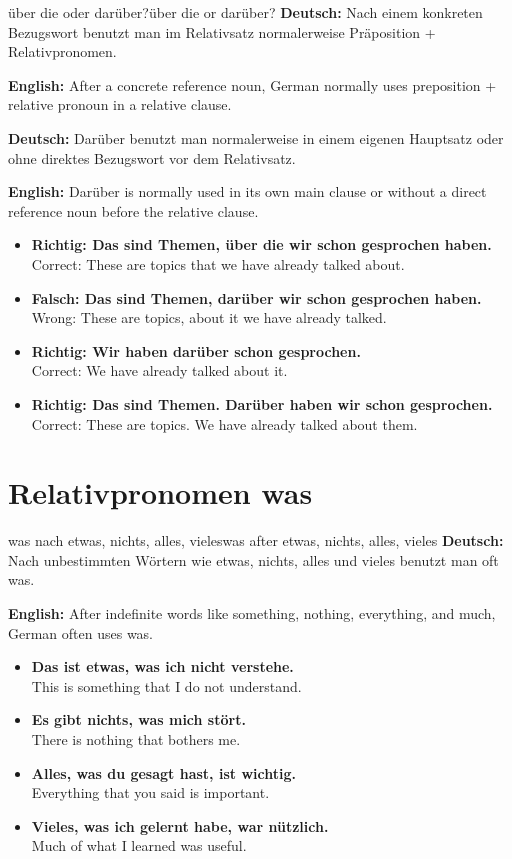 \documentclass[a4paper,11pt]{article}
\newcommand{\GermanText}[1]{\textbf{Deutsch: }#1\par}
\newcommand{\EnglishText}[1]{{\small\color{SoftGray}\textbf{English: }#1\par}}
\newcommand{\ExampleItem}[2]{\item \textbf{#1}\\{\small\color{SoftGray}#2}}
\begin{document}
        \begin{grammarentry}{über die oder darüber?}{über die or darüber?}
            \GermanText{Nach einem konkreten Bezugswort benutzt man im Relativsatz normalerweise Präposition + Relativpronomen.}
            \EnglishText{After a concrete reference noun, German normally uses preposition + relative pronoun in a relative clause.}
            
            \GermanText{Darüber benutzt man normalerweise in einem eigenen Hauptsatz oder ohne direktes Bezugswort vor dem Relativsatz.}
            \EnglishText{Darüber is normally used in its own main clause or without a direct reference noun before the relative clause.}
            
            \begin{exbox}
                \begin{itemize}
                    \ExampleItem{Richtig: Das sind Themen, über die wir schon gesprochen haben.}{Correct: These are topics that we have already talked about.}
                    \ExampleItem{Falsch: Das sind Themen, darüber wir schon gesprochen haben.}{Wrong: These are topics, about it we have already talked.}
                    \ExampleItem{Richtig: Wir haben darüber schon gesprochen.}{Correct: We have already talked about it.}
                    \ExampleItem{Richtig: Das sind Themen. Darüber haben wir schon gesprochen.}{Correct: These are topics. We have already talked about them.}
                \end{itemize}
            \end{exbox}
        \end{grammarentry}
    
    
    \section{Relativpronomen was}
        
        \begin{grammarentry}{was nach etwas, nichts, alles, vieles}{was after etwas, nichts, alles, vieles}
            \GermanText{Nach unbestimmten Wörtern wie etwas, nichts, alles und vieles benutzt man oft was.}
            \EnglishText{After indefinite words like something, nothing, everything, and much, German often uses was.}
            
            \begin{exbox}
                \begin{itemize}
                    \ExampleItem{Das ist etwas, was ich nicht verstehe.}{This is something that I do not understand.}
                    \ExampleItem{Es gibt nichts, was mich stört.}{There is nothing that bothers me.}
                    \ExampleItem{Alles, was du gesagt hast, ist wichtig.}{Everything that you said is important.}
                    \ExampleItem{Vieles, was ich gelernt habe, war nützlich.}{Much of what I learned was useful.}
                \end{itemize}
            \end{exbox}
        \end{grammarentry}
    
\end{document}

